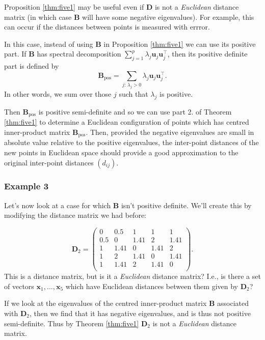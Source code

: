 \documentclass[
]{book}
\theoremstyle{definition}
\theoremstyle{definition}
\theoremstyle{definition}
\theoremstyle{definition}
\theoremstyle{remark}
\begin{document}
Proposition \ref{thm:five1} may be useful even if \({\mathbf D}\) is not a \emph{Euclidean} distance matrix (in which case \(\mathbf B\) will have some negative eigenvalues). For example, this can occur if the distances between points is measured with errror.

In this case, instead of using \(\mathbf B\) in Proposition \ref{thm:five1} we can use its positive part. If \(\mathbf B\) has spectral decomposition \(\sum_{j=1}^p \lambda_j \mathbf u_j \mathbf u_j^\top\), then its positive definite part is defined by
\[
\mathbf B_{\text{pos}}=\sum_{j: \, \lambda_j>0} \lambda_j \mathbf u_j \mathbf u_j^\top.
\]
In other words, we sum over those \(j\) such that \(\lambda_j\) is positive.

Then \(\mathbf B_{\text{pos}}\) is positive semi-definite and so we can use part 2. of Theorem \ref{thm:five1} to determine a Euclidean configuration of points which has centred inner-product matrix \(\mathbf B_{\text{pos}}\). Then, provided the negative eigenvalues are small in absolute value relative to the positive eigenvalues, the inter-point distances of the new points in Euclidean space should provide a good approximation to the original inter-point distances \((d_{ij})\).

\subsubsection*{Example 3}\label{example-3}

Let's now look at a case for which \(\mathbf B\) isn't positive definite. We'll create this by modifying the distance matrix we had before:

\[\mathbf D_2 = \begin{pmatrix}0&0.5&1&1&1 \\0.5&0&1.41&2&1.41 \\1&1.41&0&1.41&2 \\1&2&1.41&0&1.41 \\1&1.41&2&1.41&0 \\\end{pmatrix}.\]
This is a distance matrix, but is it a \emph{Euclidean} distance matrix? I.e., is there a set of vectors \(\mathbf x_1, \ldots, \mathbf x_5\) which have Euclidean distances between them given by \(\mathbf D_2\)?

If we look at the eigenvalues of the centred inner-product matrix \(\mathbf B\) associated with \(\mathbf D_2\), then we find that it has negative eigenvalues, and is thus not positive semi-definite. Thus by Theorem \ref{thm:five1} \(\mathbf D_2\) is not a \emph{Euclidean} distance matrix.
\end{document}
